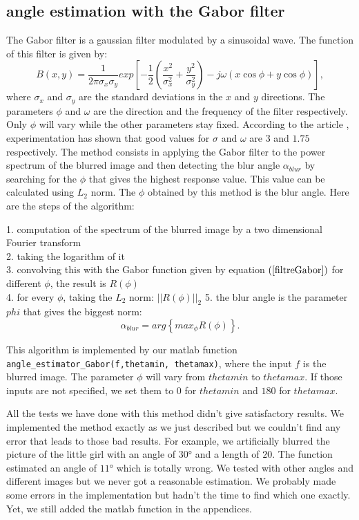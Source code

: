 \subsection{angle estimation with the Gabor filter}

The Gabor filter is a gaussian filter modulated by a sinusoidal wave. The function of this filter is given by:
\begin{equation}
B(x,y)=\dfrac{1}{2\pi \sigma_x \sigma_y} exp\left[-\frac{1}{2}\left(\frac{x^2}{\sigma_x^2}+ \frac{y^2}{\sigma_y^2} \right) -j\omega(x\cos\phi + y\cos\phi)\right],
\label{filtreGabor}
\end{equation}
where $\sigma_x$ and $\sigma_y$ are the standard deviations in the $x$ and $y$ directions. The parameters $\phi$ and $\omega$ are the direction and the frequency of the filter respectively. Only $\phi$ will vary while the other parameters stay fixed. According to the article \cite{dash2014motion}, experimentation has shown that good values for $\sigma$ and $\omega$ are $3$ and $1.75$ respectively. The method consists in applying the Gabor filter to the power spectrum of the blurred image and then detecting the blur angle $\alpha_{blur}$ by searching for the $\phi$ that gives the highest response value. This value can be calculated using $L_2$ norm. The $\phi$ obtained by this method is the blur angle. Here are the steps of the algorithm:

1. computation of the spectrum of the blurred image by a two dimensional Fourier transform\\
2. taking the logarithm of it\\
3. convolving this with the Gabor function given by equation $(\ref{filtreGabor})$ for different $\phi$, the result is $R(\phi)$\\
4. for every $\phi$, taking the $L_2$ norm: $||R(\phi)||_2$
5. the blur angle is the parameter $phi$ that gives the biggest norm:
\begin{equation}
\alpha_{blur} = arg \left\lbrace max_{\phi}R(\phi)\right\rbrace.
\end{equation}

This algorithm is implemented by our matlab function \texttt{angle_estimator_Gabor(f,thetamin, thetamax)}, where the input $f$ is the blurred image. The parameter $\phi$ will vary from $thetamin$ to $thetamax$. If those inputs are not specified, we set them to $0$ for $thetamin$ and $180$ for $thetamax$.

All the tests we have done with this method didn't give satisfactory results. We implemented the method exactly as we just described but we couldn't find any error that leads to those bad results. For example, we artificially blurred the picture of the little girl with an angle of $30°$ and a length of $20$. The function estimated an angle of $11°$ which is totally wrong. We tested with other angles and different images but we never got a reasonable estimation. We probably made some errors in the implementation but hadn't the time to find which one exactly. Yet, we still added the matlab function in the appendices.

